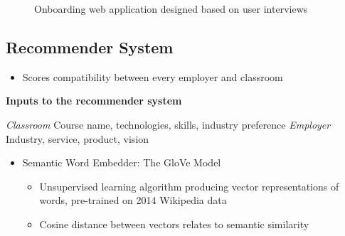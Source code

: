 \documentclass[clinic]{hmcposter}
\begin{document}
\begin{poster}
\begin{figure}
{        }\qquad\qquad
  \caption[]{Onboarding web application designed based on user interviews}%
\end{figure}



\subsection{Recommender System}%

\begin{itemize}
    \item Scores compatibility between every employer and classroom
\end{itemize}
\begin{center}
\textbf{Inputs to the recommender system}
\end{center}
    \begin{itemize}
        \begin{multicols}{2}
            \centering
            \textit{Classroom}
            \vfill
            Course name, technologies, skills, industry preference
            \vfill
            \columnbreak
            \centering
            \textit{Employer} \\
            Industry, service, product, vision
        \end{multicols}
        \end{itemize}
\begin{itemize}
    \item Semantic Word Embedder: The GloVe Model
    \begin{itemize}
        \item Unsupervised learning algorithm producing vector representations of words, pre-trained on 2014 Wikipedia data
        \item Cosine distance between vectors relates to semantic similarity
    \end{itemize}
\end{itemize}


\end{poster}
\end{document}
